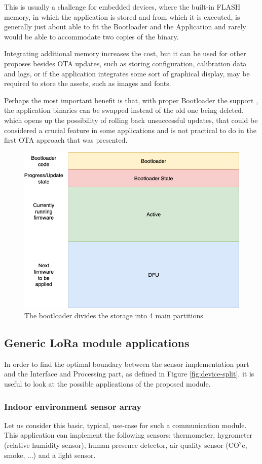 This is usually a challenge for embedded devices, where the built-in FLASH memory, in which the application is stored and from which it is executed, is generally just about able to fit the Bootloader and the Application and rarely would be able to accommodate two copies of the binary.

Integrating additional memory increases the cost, but it can be used for other proposes besides OTA updates, such as storing configuration, calibration data and logs, or if the application integrates some sort of graphical display, may be required to store the assets, such as images and fonts.

Perhaps the most important benefit is that, with proper Bootloader the support \cite{drogue_iot_firmware_2024,embassy_project_documentation_bootloader_2024}, the application binaries can be swapped instead of the old one being deleted, which opens up the possibility of rolling back unsuccessful updates, that could be considered a crucial feature in some applications and is not practical to do in the first OTA approach that was presented.

\begin{figure}
    \includegraphics[width=.6\textwidth]{fig/bootloader_flash.png}
    \caption{\label{fig:bootloader-flash}The bootloader divides the storage into 4 main partitions}
\end{figure}

\subsection{\label{section:application-case-studies}Generic LoRa module applications}
In order to find the optimal boundary between the sensor implementation part and the Interface and Processing part, as defined in Figure \ref{fig:device-split}, it is useful to look at the possible applications of the proposed module.

\subsubsection{Indoor environment sensor array}
Let us consider this basic, typical, use-case for such a communication module. This application can implement the following sensors: thermometer, hygrometer (relative humidity sensor), human presence detector, air quality sensor (CO$^2$e, smoke, ...) and a light sensor.

